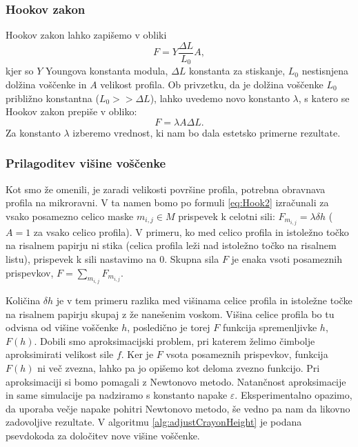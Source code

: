 \subsubsection{Hookov zakon}
Hookov zakon lahko zapišemo v obliki
$$F = Y \frac{\Delta L}{L_0} A,$$
kjer so $Y$ Youngova konstanta modula, $\Delta L$ konstanta za stiskanje, $L_0$ nestisnjena dolžina voščenke in $A$ velikost profila. Ob privzetku, da je dolžina voščenke $L_0$ približno konstantna ($L_0 >> \Delta L$), lahko uvedemo novo konstanto $\lambda$, s katero se Hookov zakon prepiše v obliko:
%
\begin{equation}\label{eq:Hook2}
F = \lambda A \Delta L.
\end{equation}
%
Za konstanto $\lambda$ izberemo vrednost, ki nam bo dala estetsko primerne rezultate.
%
\subsubsection{Prilagoditev višine voščenke}
Kot smo že omenili, je zaradi velikosti površine profila, potrebna obravnava profila na mikroravni. V ta namen bomo po formuli \eqref{eq:Hook2} izračunali za vsako posamezno celico maske $m_{i,j} \in M$ prispevek k celotni sili: $F_{m_{i,j}} = \lambda \delta h$ ($A = 1$ za vsako celico profila). V primeru, ko med celico profila in istoležno točko na risalnem papirju ni stika (celica profila leži nad istoležno točko na risalnem listu), prispevek k sili nastavimo na 0. Skupna sila $F$ je enaka vsoti posameznih prispevkov, $F = \sum_{m_{i,j}} F_{m_{i,j}}$.

Količina $\delta h$ je v tem primeru razlika med višinama celice profila in istoležne točke na risalnem papirju skupaj z že nanešenim voskom. Višina celice profila bo tu odvisna od višine voščenke $h$, posledično je torej $F$ funkcija spremenljivke $h$, $F(h)$. Dobili smo aproksimacijski problem, pri katerem želimo čimbolje aproksimirati velikost sile $f$. Ker je $F$ vsota posameznih prispevkov, funkcija $F(h)$ ni več zvezna, lahko pa jo opišemo kot deloma zvezno funkcijo. Pri aproksimaciji si bomo pomagali z Newtonovo metodo. Natančnost aproksimacije in same simulacije pa nadziramo s konstanto napake $\varepsilon$. Eksperimentalno opazimo, da uporaba večje napake pohitri Newtonovo metodo, še vedno pa nam da likovno zadovoljive rezultate. V algoritmu \ref{alg:adjustCrayonHeight} je podana psevdokoda za določitev nove višine voščenke.

